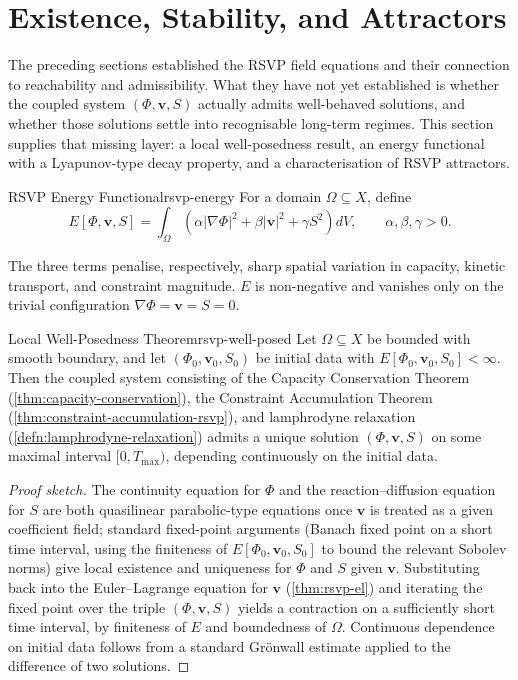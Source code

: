 \documentclass[12pt,twoside,openright]{book}
\begin{document}
\section{Existence, Stability, and Attractors}
\label{sec:ch16-existence}

The preceding sections established the RSVP field equations
and their connection to reachability and admissibility. What
they have not yet established is whether the coupled system
$(\Phi,\mathbf{v},S)$ actually admits well-behaved solutions,
and whether those solutions settle into recognisable
long-term regimes. This section supplies that missing layer:
a local well-posedness result, an energy functional with a
Lyapunov-type decay property, and a characterisation of RSVP
attractors.

\begin{definition}{RSVP Energy Functional}{rsvp-energy}
  For a domain $\Omega\subseteq X$, define
  \[
    E[\Phi,\mathbf{v},S]
    = \int_\Omega \left(
        \alpha|\nabla\Phi|^2
        + \beta|\mathbf{v}|^2
        + \gamma S^2
      \right) dV,
    \qquad \alpha,\beta,\gamma > 0.
  \]
\end{definition}

The three terms penalise, respectively, sharp spatial
variation in capacity, kinetic transport, and constraint
magnitude. $E$ is non-negative and vanishes only on the
trivial configuration $\nabla\Phi=\mathbf{v}=S=0$.

\begin{theorem}{Local Well-Posedness Theorem}{rsvp-well-posed}
  Let $\Omega\subseteq X$ be bounded with smooth boundary,
  and let $(\Phi_0,\mathbf{v}_0,S_0)$ be initial data with
  $E[\Phi_0,\mathbf{v}_0,S_0] < \infty$. Then the coupled
  system consisting of the Capacity Conservation Theorem
  (\cref{thm:capacity-conservation}), the Constraint
  Accumulation Theorem
  (\cref{thm:constraint-accumulation-rsvp}), and lamphrodyne
  relaxation (\cref{defn:lamphrodyne-relaxation}) admits a
  unique solution $(\Phi,\mathbf{v},S)$ on some maximal
  interval $[0,T_{\max})$, depending continuously on the
  initial data.
\end{theorem}

\begin{proof}[Proof sketch]
  The continuity equation for $\Phi$ and the
  reaction--diffusion equation for $S$ are both
  quasilinear parabolic-type equations once
  $\mathbf{v}$ is treated as a given coefficient field;
  standard fixed-point arguments (Banach fixed point on a
  short time interval, using the finiteness of
  $E[\Phi_0,\mathbf{v}_0,S_0]$ to bound the relevant
  Sobolev norms) give local existence and uniqueness for
  $\Phi$ and $S$ given $\mathbf{v}$. Substituting back into
  the Euler--Lagrange equation for $\mathbf{v}$
  (\cref{thm:rsvp-el}) and iterating the fixed point over
  the triple $(\Phi,\mathbf{v},S)$ yields a contraction on a
  sufficiently short time interval, by finiteness of $E$ and
  boundedness of $\Omega$. Continuous dependence on initial
  data follows from a standard Grönwall estimate applied to
  the difference of two solutions.
\end{proof}
\end{document}
